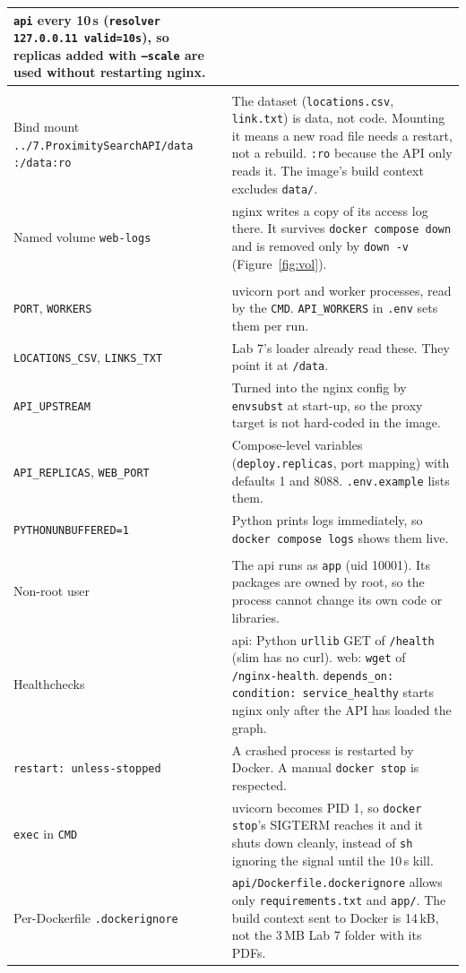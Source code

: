 \documentclass[11pt,a4paper]{article}
\begin{document}
{\begin{xltabular}{\linewidth}{@{}>{\raggedright\arraybackslash}p{3.3cm}L@{}}
  \texttt{api} every 10\,s (\texttt{resolver 127.0.0.11 valid=10s}), so replicas added with \texttt{--scale} are used
  without restarting nginx. \\
\midrule
{} \\
Bind mount \texttt{../7.Proximity\-SearchAPI/data} \texttt{:/data:ro} & The dataset (\texttt{locations.csv}, \texttt{link.txt})
  is data, not code. Mounting it means a new road file needs a restart, not a rebuild. \texttt{:ro} because the API
  only reads it. The image's build context excludes \texttt{data/}. \\
Named volume \texttt{web-logs} & nginx writes a copy of its access log there. It survives \texttt{docker compose
  down} and is removed only by \texttt{down -v} (Figure~\ref{fig:vol}). \\
\midrule
{} \\
\texttt{PORT}, \texttt{WORKERS} & uvicorn port and worker processes, read by the \texttt{CMD}. \texttt{API\_WORKERS} in
  \texttt{.env} sets them per run. \\
\texttt{LOCATIONS\_CSV}, \texttt{LINKS\_TXT} & Lab 7's loader already read these. They point it at \texttt{/data}. \\
\texttt{API\_UPSTREAM} & Turned into the nginx config by \texttt{envsubst} at start-up, so the proxy target is not
  hard-coded in the image. \\
\texttt{API\_REPLICAS}, \texttt{WEB\_PORT} & Compose-level variables (\texttt{deploy.replicas}, port mapping) with
  defaults 1 and 8088. \texttt{.env.example} lists them. \\
\texttt{PYTHON\-UNBUFFERED=1} & Python prints logs immediately, so \texttt{docker compose logs} shows them live. \\
\midrule
{} \\
Non-root user & The api runs as \texttt{app} (uid 10001). Its packages are owned by root, so the process cannot
  change its own code or libraries. \\
Healthchecks & api: Python \texttt{urllib} GET of \texttt{/health} (slim has no curl). web: \texttt{wget} of
  \texttt{/nginx-health}. \texttt{depends\_on: condition: service\_healthy} starts nginx only after the API has loaded
  the graph. \\
\texttt{restart: unless-stopped} & A crashed process is restarted by Docker. A manual \texttt{docker stop} is
  respected. \\
\texttt{exec} in \texttt{CMD} & uvicorn becomes PID 1, so \texttt{docker stop}'s SIGTERM reaches it and it shuts down
  cleanly, instead of \texttt{sh} ignoring the signal until the 10\,s kill. \\
Per-Dockerfile \texttt{.docker\-ignore} & \texttt{api/Dockerfile.dockerignore} allows only \texttt{requirements.txt} and
  \texttt{app/}. The build context sent to Docker is 14\,kB, not the 3\,MB Lab 7 folder with its PDFs. \\
\bottomrule
\end{xltabular}}
\end{document}
